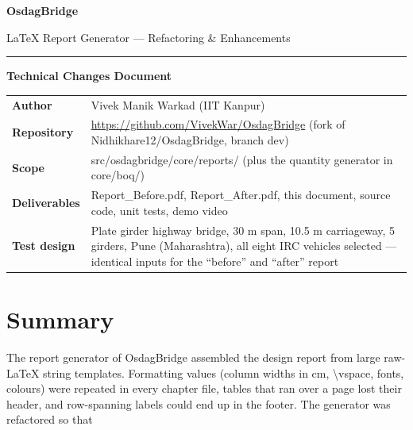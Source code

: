 \documentclass[10pt,a4paper]{article}
\newcommand{\file}[1]{{\footnotesize\ttfamily #1}}
\newcommand{\code}[1]{{\small\ttfamily #1}}
\begin{document}
\begin{center}
{\sffamily\Huge\bfseries OsdagBridge\par}
\vspace{2pt}
{\sffamily\Large LaTeX Report Generator --- Refactoring \& Enhancements\par}
\vspace{4pt}
{\color{osdagGreen}\rule{0.4\textwidth}{1.2pt}\par}
\vspace{4pt}
{\sffamily\large\bfseries\color{osdagDark} Technical Changes Document\par}
\end{center}

\begin{center}
\begin{tabular}{@{}L{0.22\textwidth}L{0.70\textwidth}@{}}
\toprule
\textbf{Author} & Vivek Manik Warkad (IIT Kanpur) \\
\textbf{Repository} & \url{https://github.com/VivekWar/OsdagBridge} (fork of \code{Nidhikhare12/OsdagBridge}, branch \code{dev}) \\
\textbf{Scope} & \file{src/osdagbridge/core/reports/} (plus the quantity generator in \file{core/boq/}) \\
\textbf{Deliverables} & \file{Report\_Before.pdf}, \file{Report\_After.pdf}, this document, source code, unit tests, demo video \\
\textbf{Test design} & Plate girder highway bridge, 30 m span, 10.5 m carriageway, 5 girders, Pune (Maharashtra), all eight IRC vehicles selected --- identical inputs for the ``before'' and ``after'' report \\
\bottomrule
\end{tabular}
\end{center}

\section{Summary}

The report generator of OsdagBridge assembled the design report from large raw-LaTeX string templates.
Formatting values (column widths in cm, \code{\textbackslash vspace}, fonts, colours) were repeated in every chapter file, tables that ran over a page lost their header, and row-spanning labels could end up in the footer.
The generator was refactored so that
\end{document}
